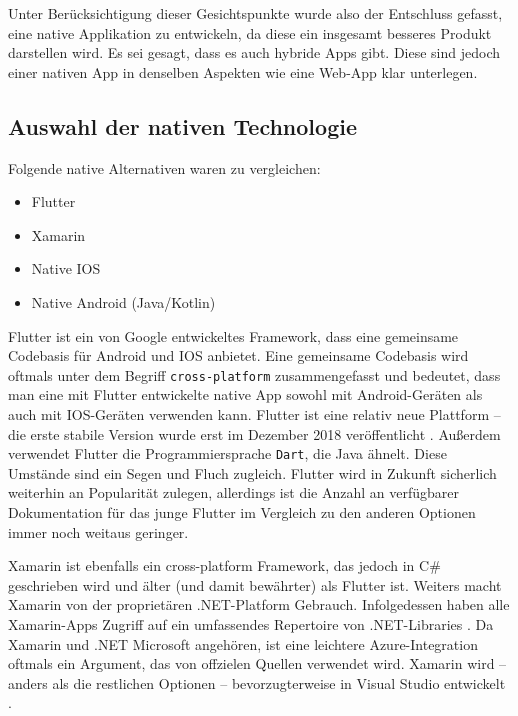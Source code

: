 Unter Berücksichtigung dieser Gesichtspunkte wurde also der Entschluss
gefasst, eine native Applikation zu entwickeln, da diese ein insgesamt
besseres Produkt darstellen wird. Es sei gesagt, dass es auch hybride
Apps gibt. Diese sind jedoch einer nativen App in denselben Aspekten wie
eine Web-App klar unterlegen.

\hypertarget{auswahl-der-nativen-technologie}{%
\subsection{Auswahl der nativen
Technologie}\label{auswahl-der-nativen-technologie}}

Folgende native Alternativen waren zu vergleichen:

\begin{itemize}
\tightlist
\item
  Flutter \cite{flutter}
\item
  Xamarin \cite{xamarin}
\item
  Native IOS
\item
  Native Android (Java/Kotlin)
\end{itemize}

Flutter ist ein von Google entwickeltes Framework, dass eine gemeinsame
Codebasis für Android und IOS anbietet. Eine gemeinsame Codebasis wird
oftmals unter dem Begriff \texttt{cross-platform} zusammengefasst und
bedeutet, dass man eine mit Flutter entwickelte native App sowohl mit
Android-Geräten als auch mit IOS-Geräten verwenden kann. Flutter ist
eine relativ neue Plattform -- die erste stabile Version wurde erst im
Dezember 2018 veröffentlicht \cite{flutter-stable}. Außerdem verwendet
Flutter die Programmiersprache \texttt{Dart}, die Java ähnelt. Diese
Umstände sind ein Segen und Fluch zugleich. Flutter wird in Zukunft
sicherlich weiterhin an Popularität zulegen, allerdings ist die Anzahl
an verfügbarer Dokumentation für das junge Flutter im Vergleich zu den
anderen Optionen immer noch weitaus geringer.

Xamarin ist ebenfalls ein cross-platform Framework, das jedoch in C\#
geschrieben wird und älter (und damit bewährter) als Flutter ist.
Weiters macht Xamarin von der proprietären .NET-Platform Gebrauch.
Infolgedessen haben alle Xamarin-Apps Zugriff auf ein umfassendes
Repertoire von .NET-Libraries \cite{xamarin-details}. Da Xamarin und
.NET Microsoft angehören, ist eine leichtere Azure-Integration oftmals
ein Argument, das von offzielen Quellen verwendet wird. Xamarin wird --
anders als die restlichen Optionen -- bevorzugterweise in Visual Studio
entwickelt \cite{xamarin-vs}.


